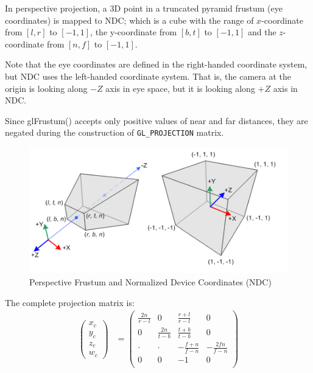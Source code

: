 In perspective projection, a 3D point in a truncated pyramid frustum (eye coordinates) is mapped to NDC; which is a cube with the range of $x$-coordinate from $[l, r]$ to $[-1, 1]$, the y-coordinate from $[b, t]$ to $[-1, 1]$ and the $z$-coordinate from $[n, f]$ to $[-1, 1]$.

Note that the eye coordinates are defined in the right-handed coordinate system, but NDC uses the left-handed coordinate system. That is, the camera at the origin is looking along $-Z$ axis in eye space, but it is looking along $+Z$ axis in NDC.

Since glFrustum() accepts only positive values of near and far distances, they are negated during the construction of \verb|GL_PROJECTION| matrix.

\begin{figure}[h!]
\centering
\includegraphics[width=0.9\linewidth,keepaspectratio=true]{figs/gl_projectionmatrix01.png}
\caption{Perspective Frustum and Normalized Device Coordinates (NDC)}
\label{fig.ndc}
\end{figure}

 The complete projection matrix is: 
\begin{equation}
\begin{aligned}
\begin{pmatrix} x_{c}\\y_{c}\\z_{c}\\w_{c} \end{pmatrix} &= 
\begin{pmatrix} 
\frac{2n}{r-l} & 0 & \frac{r+l}{r-l} & 0 \\
0 & \frac{2n}{t-b} & \frac{t+b}{t-b} & 0 \\
\cdot & \cdot & -\frac{f+n}{f-n} & -\frac{2fn}{f-n} \\
0 & 0 & -1 & 0 \\
\end{pmatrix} \\
\end{aligned}
\label{eq.projection_matrix}
\end{equation}


